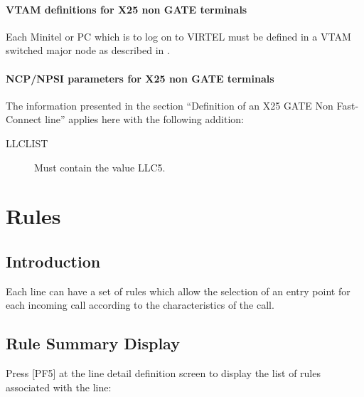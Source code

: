\documentclass[letterpaper,10pt,english]{sphinxmanual}
\begin{document}
\subsubsection{VTAM definitions for X25 non GATE terminals}
\label{\detokenize{connectivity_guide:vtam-definitions-for-x25-non-gate-terminals}}
Each Minitel or PC which is to log on to VIRTEL must be defined in a VTAM switched major node as described in {\hyperref[\detokenize{connectivity_guide:bookmark94}]{}}.


\subsubsection{NCP/NPSI parameters for X25 non GATE terminals}
\label{\detokenize{connectivity_guide:ncp-npsi-parameters-for-x25-non-gate-terminals}}
The information presented in the section “Definition of an X25 GATE Non Fast-Connect line” applies here with the following addition:

\begin{description}
\item[{LLCLIST}] \leavevmode
Must contain the value LLC5.

\end{description}


\chapter{Rules}
\label{\detokenize{connectivity_guide:rules}}

\section{Introduction}
\label{\detokenize{connectivity_guide:id3}}
Each line can have a set of rules which allow the selection of an entry point for each incoming call according to the characteristics of the call.


\section{Rule Summary Display}
\label{\detokenize{connectivity_guide:rule-summary-display}}
Press {[}PF5{]} at the line detail definition screen to display the list of rules associated with the line:

\end{document}
